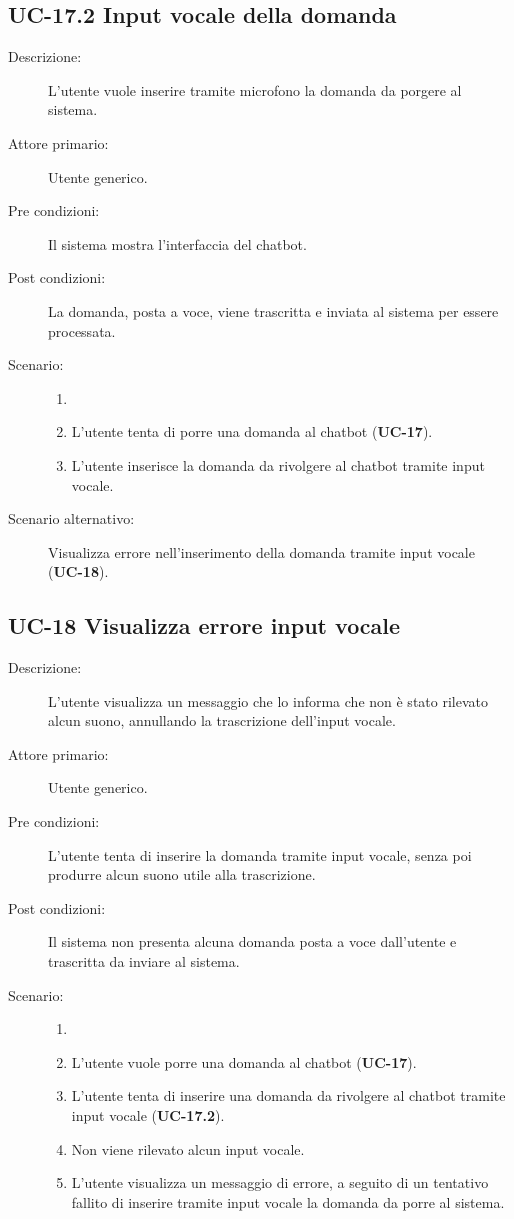 \subsection{UC-17.2 Input vocale della domanda}
\begin{description}
    \item[Descrizione:] L'utente vuole inserire tramite microfono la domanda da porgere al sistema.
    \item[Attore primario:] Utente generico.
    \item[Pre condizioni:] Il sistema mostra l'interfaccia del chatbot.
    \item[Post condizioni:] La domanda, posta a voce, viene trascritta e inviata al sistema per essere processata.
    \item[Scenario:]
    \begin{enumerate}
        \item[]
        \item L’utente tenta di porre una domanda al chatbot (\textbf{UC-17}).
        \item L'utente inserisce la domanda da rivolgere al chatbot tramite input vocale.
    \end{enumerate}
    \item[Scenario alternativo:] Visualizza errore nell'inserimento della domanda tramite input vocale (\textbf{UC-18}).
\end{description}

\subsection{UC-18 Visualizza errore input vocale}
\begin{description}
    \item[Descrizione:] L'utente visualizza un messaggio che lo informa che non è stato rilevato alcun suono, annullando la trascrizione dell'input vocale.
    \item[Attore primario:] Utente generico.
    \item[Pre condizioni:] L'utente tenta di inserire la domanda tramite input vocale, senza poi produrre alcun suono utile alla trascrizione.
    \item[Post condizioni:] Il sistema non presenta alcuna domanda posta a voce dall'utente e trascritta da inviare al sistema.
    \item[Scenario:] 
    \begin{enumerate}
        \item[]
        \item L’utente vuole porre una domanda al chatbot (\textbf{UC-17}).
        \item L'utente tenta di inserire una domanda da rivolgere al chatbot tramite input vocale (\textbf{UC-17.2}).
        \item Non viene rilevato alcun input vocale.
        \item L'utente visualizza un messaggio di errore, a seguito di un tentativo fallito di inserire tramite input vocale la domanda da porre al sistema.
    \end{enumerate}
\end{description}

